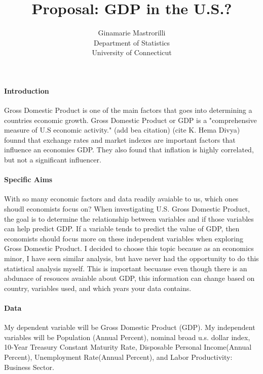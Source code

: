 \documentclass[12pt]{article}
\title{Proposal: GDP in the U.S.? }
\author{Ginamarie Mastrorilli\\
  Department of Statistics\\
  University of Connecticut
}
\begin{document}
\maketitle


\paragraph{Introduction}
Gross Domestic Product is one of the main factors that goes into determining a countries economic growth. Gross Domestic Product or GDP is a "comprehensive measure of U.S economic activity." (add bea citation) 
(cite K. Hema Divya) founnd that exchange rates and market indexes are important factors that influence an economies GDP. They also found that inflation is highly correlated, but not a significant influencer.  

\paragraph{Specific Aims}
With so many economic factors and data readily avaiable to us, which ones shoudl economists focus on?
When investigating U.S. Gross Domestic Product, the goal is to determine the relationship between variables and if those variables can help predict GDP.
If a variable tends to predict the value of GDP, then economists should focus more on these independent variables when exploring Gross Domestic Product.
I decided to choose this topic because as an economics minor, I have seen similar analysis, but have never had the opportunity to do this statistical analysis myself. 
This is important becuause even though there is an abdunace of resouces avaiable about GDP, this information can change based on country, variables used, and which years your data contains. 


\paragraph{Data}
My dependent variable will be Gross Domestic Product (GDP).
My independent variables will be Population (Annual Percent), nominal broad u.s. dollar index, 10-Year Treasury Constant Maturity Rate, Disposable Personal Income(Annual Percent), Unemployment Rate(Annual Percent), and Labor Productivity: Business Sector. 
\end{document}
